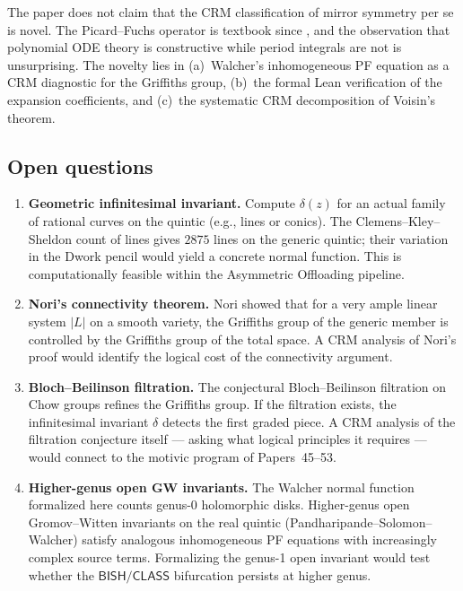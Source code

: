 \documentclass[11pt]{article}
\theoremstyle{plain}
\theoremstyle{definition}
\theoremstyle{remark}
\newcommand{\BISH}{\ensuremath{\mathsf{BISH}}}
\newcommand{\CLASS}{\ensuremath{\mathsf{CLASS}}}
\begin{document}
The paper does not claim that the CRM classification of mirror symmetry per se is novel. The Picard--Fuchs operator is textbook since \cite{candelas-ossa-green-parkes}, and the observation that polynomial ODE theory is constructive while period integrals are not is unsurprising. The novelty lies in (a)~Walcher's inhomogeneous PF equation as a CRM diagnostic for the Griffiths group, (b)~the formal Lean verification of the expansion coefficients, and (c)~the systematic CRM decomposition of Voisin's theorem.

\subsection{Open questions}

\begin{enumerate}[nosep]
\item \textbf{Geometric infinitesimal invariant.} Compute $\delta(z)$ for an actual family of rational curves on the quintic (e.g., lines or conics). The Clemens--Kley--Sheldon count of lines gives $2875$ lines on the generic quintic; their variation in the Dwork pencil would yield a concrete normal function. This is computationally feasible within the Asymmetric Offloading pipeline.

\item \textbf{Nori's connectivity theorem.} Nori \cite{voisin2002} showed that for a very ample linear system $|L|$ on a smooth variety, the Griffiths group of the generic member is controlled by the Griffiths group of the total space. A CRM analysis of Nori's proof would identify the logical cost of the connectivity argument.

\item \textbf{Bloch--Beilinson filtration.} The conjectural Bloch--Beilinson filtration on Chow groups refines the Griffiths group. If the filtration exists, the infinitesimal invariant $\delta$ detects the first graded piece. A CRM analysis of the filtration conjecture itself --- asking what logical principles it requires --- would connect to the motivic program of Papers~45--53.

\item \textbf{Higher-genus open GW invariants.} The Walcher normal function formalized here counts genus-0 holomorphic disks. Higher-genus open Gromov--Witten invariants on the real quintic (Pandharipande--Solomon--Walcher) satisfy analogous inhomogeneous PF equations with increasingly complex source terms. Formalizing the genus-1 open invariant would test whether the $\BISH/\CLASS$ bifurcation persists at higher genus.
\end{enumerate}
\end{document}
